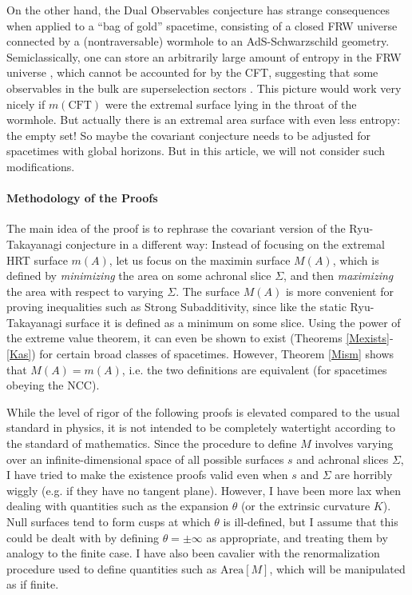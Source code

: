\documentclass{article}
\begin{document}
On the other hand, the Dual Observables conjecture has strange consequences when applied to a ``bag of gold'' spacetime, consisting of a closed FRW universe connected by a (nontraversable) wormhole to an AdS-Schwarzschild geometry.  Semiclassically, one can store an arbitrarily large amount of entropy in the FRW universe \cite{sorkin97,jacobson99,marolf08,FHMMRS05}, which cannot be accounted for by the CFT, suggesting that some observables in the bulk are superselection sectors \cite{MW12}.  This picture would work very nicely if $m(\mathrm{CFT})$ were the extremal surface lying in the throat of the wormhole.  But actually there is an extremal area surface with even less entropy: the empty set!  So maybe the covariant conjecture needs to be adjusted for spacetimes with global horizons.  But in this article, we will not consider such modifications.


\paragraph{Methodology of the Proofs} The main idea of the proof is to rephrase the covariant version of the Ryu-Takayanagi conjecture in a different way: Instead of focusing on the extremal HRT surface $m(A)$, let us focus on the maximin surface $M(A)$, which is defined by \emph{minimizing} the area on some achronal slice $\Sigma$, and then \emph{maximizing} the area with respect to varying $\Sigma$.  The surface $M(A)$ is more convenient for proving inequalities such as Strong Subadditivity, since like the static Ryu-Takayanagi surface it is defined as a minimum on some slice.  Using the power of the extreme value theorem, it can even be shown to exist (Theorems \ref{Mexists}-\ref{Kas}) for certain broad classes of spacetimes.  However, Theorem \ref{Mism} shows that $M(A) = m(A)$, i.e. the two definitions are equivalent (for spacetimes obeying the NCC).

While the level of rigor of the following proofs is elevated compared to the usual standard in physics, it is not intended to be completely watertight according to the standard of mathematics.  Since the procedure to define $M$ involves varying over an infinite-dimensional space of all possible surfaces $s$ and achronal slices $\Sigma$, I have tried to make the existence proofs valid even when $s$ and $\Sigma$ are horribly wiggly (e.g. if they have no tangent plane).  However, I have been more lax when dealing with quantities such as the expansion $\theta$ (or the extrinsic curvature $K$).  Null surfaces tend to form cusps at which $\theta$ is ill-defined, but I assume that this could be dealt with by defining $\theta = \pm \infty$ as appropriate, and treating them by analogy to the finite case.  I have also been cavalier with the renormalization procedure used to define quantities such as $\mathrm{Area}[M]$, which will be manipulated as if finite.  
\end{document}
